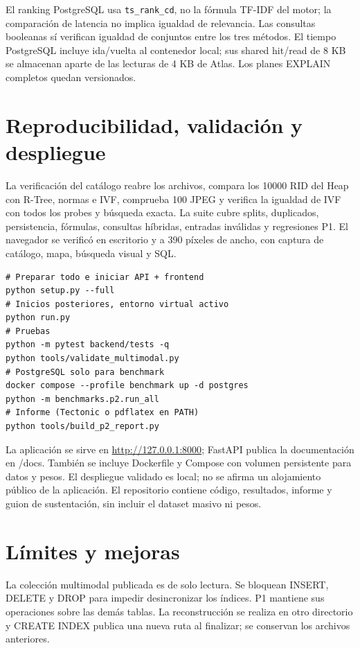 \documentclass[11pt,a4paper]{article}
\newcommand{\code}[1]{\texttt{#1}}
\begin{document}
El ranking PostgreSQL usa \code{ts\_rank\_cd}, no la fórmula TF-IDF del motor; la comparación de latencia no implica igualdad de relevancia. Las consultas booleanas sí verifican igualdad de conjuntos entre los tres métodos. El tiempo PostgreSQL incluye ida/vuelta al contenedor local; sus shared hit/read de 8 KB se almacenan aparte de las lecturas de 4 KB de Atlas. Los planes EXPLAIN completos quedan versionados.



\clearpage
\section{Reproducibilidad, validación y despliegue}

La verificación del catálogo reabre los archivos, compara los 10000 RID del Heap con R-Tree, normas e IVF, comprueba 100 JPEG y verifica la igualdad de IVF con todos los probes y búsqueda exacta. La suite cubre splits, duplicados, persistencia, fórmulas, consultas híbridas, entradas inválidas y regresiones P1. El navegador se verificó en escritorio y a 390 píxeles de ancho, con captura de catálogo, mapa, búsqueda visual y SQL.

\begin{lstlisting}
# Preparar todo e iniciar API + frontend
python setup.py --full
# Inicios posteriores, entorno virtual activo
python run.py
# Pruebas
python -m pytest backend/tests -q
python tools/validate_multimodal.py
# PostgreSQL solo para benchmark
docker compose --profile benchmark up -d postgres
python -m benchmarks.p2.run_all
# Informe (Tectonic o pdflatex en PATH)
python tools/build_p2_report.py
\end{lstlisting}

La aplicación se sirve en \url{http://127.0.0.1:8000}; FastAPI publica la documentación en /docs. También se incluye Dockerfile y Compose con volumen persistente para datos y pesos. El despliegue validado es local; no se afirma un alojamiento público de la aplicación. El repositorio contiene código, resultados, informe y guion de sustentación, sin incluir el dataset masivo ni pesos.

\section{Límites y mejoras}
La colección multimodal publicada es de solo lectura. Se bloquean INSERT, DELETE y DROP para impedir desincronizar los índices. P1 mantiene sus operaciones sobre las demás tablas. La reconstrucción se realiza en otro directorio y CREATE INDEX publica una nueva ruta al finalizar; se conservan los archivos anteriores.
\end{document}
